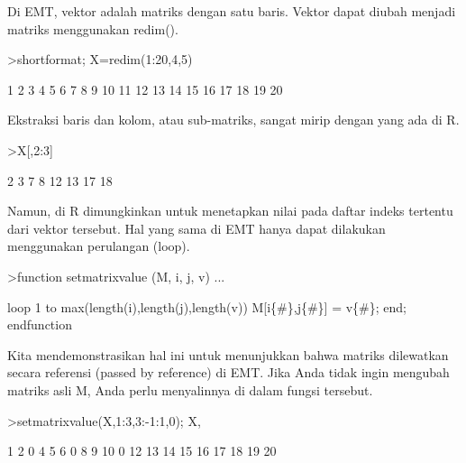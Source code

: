 \documentclass{article}
\newenvironment{eulernotebook}{\par}{\par}
\newenvironment{eulercomment}{\par\medskip}{\par\medskip}
\begin{document}
\begin{eulernotebook}
\begin{eulercomment}
\begin{eulercomment}
\begin{eulercomment}
\begin{eulercomment}
\begin{eulercomment}
Di EMT, vektor adalah matriks dengan satu baris. Vektor dapat diubah
menjadi matriks menggunakan redim().
\end{eulercomment}
\begin{eulerprompt}
>shortformat; X=redim(1:20,4,5)
\end{eulerprompt}
\begin{euleroutput}
          1         2         3         4         5 
          6         7         8         9        10 
         11        12        13        14        15 
         16        17        18        19        20 
\end{euleroutput}
\begin{eulercomment}
Ekstraksi baris dan kolom, atau sub-matriks, sangat mirip dengan yang
ada di R.
\end{eulercomment}
\begin{eulerprompt}
>X[,2:3]
\end{eulerprompt}
\begin{euleroutput}
          2         3 
          7         8 
         12        13 
         17        18 
\end{euleroutput}
\begin{eulercomment}
Namun, di R dimungkinkan untuk menetapkan nilai pada daftar indeks
tertentu dari vektor tersebut. Hal yang sama di EMT hanya dapat
dilakukan menggunakan perulangan (loop).
\end{eulercomment}
\begin{eulerprompt}
>function setmatrixvalue (M, i, j, v) ...
\end{eulerprompt}
\begin{eulerudf}
  loop 1 to max(length(i),length(j),length(v))
     M[i\{#\},j\{#\}] = v\{#\};
  end;
  endfunction
\end{eulerudf}
\begin{eulercomment}
Kita mendemonstrasikan hal ini untuk menunjukkan bahwa matriks
dilewatkan secara referensi (passed by reference) di EMT. Jika Anda
tidak ingin mengubah matriks asli M, Anda perlu menyalinnya di dalam
fungsi tersebut.
\end{eulercomment}
\begin{eulerprompt}
>setmatrixvalue(X,1:3,3:-1:1,0); X,
\end{eulerprompt}
\begin{euleroutput}
          1         2         0         4         5 
          6         0         8         9        10 
          0        12        13        14        15 
         16        17        18        19        20 

\end{euleroutput}
\end{eulercomment}
\end{eulercomment}
\end{eulercomment}
\end{eulercomment}
\end{eulernotebook}
\end{document}
